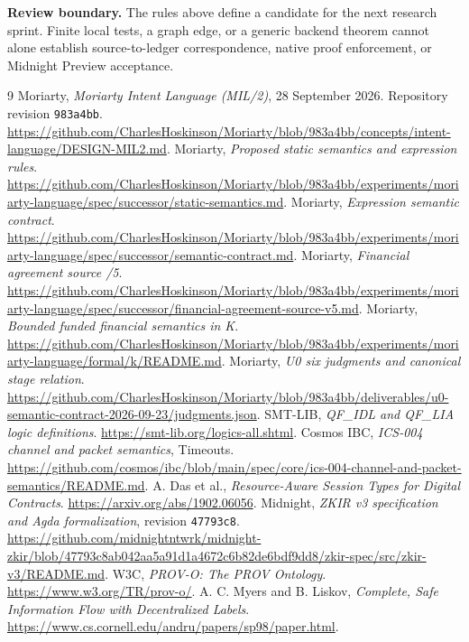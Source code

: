 \documentclass[11pt,a4paper]{article}
\theoremstyle{definition}
\begin{document}
\noindent\textbf{Review boundary.} The rules above define a candidate for the next research sprint. Finite local tests, a graph edge, or a generic backend theorem cannot alone establish source-to-ledger correspondence, native proof enforcement, or Midnight Preview acceptance.

\begingroup\RaggedRight
\begin{thebibliography}{9}
 Moriarty, \emph{Moriarty Intent Language (MIL/2)}, 28 September 2026. Repository revision \texttt{983a4bb}. \url{https://github.com/CharlesHoskinson/Moriarty/blob/983a4bb/concepts/intent-language/DESIGN-MIL2.md}.
 Moriarty, \emph{Proposed static semantics and expression rules}. \url{https://github.com/CharlesHoskinson/Moriarty/blob/983a4bb/experiments/moriarty-language/spec/successor/static-semantics.md}.
 Moriarty, \emph{Expression semantic contract}. \url{https://github.com/CharlesHoskinson/Moriarty/blob/983a4bb/experiments/moriarty-language/spec/successor/semantic-contract.md}.
 Moriarty, \emph{Financial agreement source /5}. \url{https://github.com/CharlesHoskinson/Moriarty/blob/983a4bb/experiments/moriarty-language/spec/successor/financial-agreement-source-v5.md}.
 Moriarty, \emph{Bounded funded financial semantics in K}. \url{https://github.com/CharlesHoskinson/Moriarty/blob/983a4bb/experiments/moriarty-language/formal/k/README.md}.
 Moriarty, \emph{U0 six judgments and canonical stage relation}. \url{https://github.com/CharlesHoskinson/Moriarty/blob/983a4bb/deliverables/u0-semantic-contract-2026-09-23/judgments.json}.
 SMT-LIB, \emph{QF\_IDL and QF\_LIA logic definitions}. \url{https://smt-lib.org/logics-all.shtml}.
 Cosmos IBC, \emph{ICS-004 channel and packet semantics}, Timeouts. \url{https://github.com/cosmos/ibc/blob/main/spec/core/ics-004-channel-and-packet-semantics/README.md}.
 A. Das et al., \emph{Resource-Aware Session Types for Digital Contracts}. \url{https://arxiv.org/abs/1902.06056}.
 Midnight, \emph{ZKIR v3 specification and Agda formalization}, revision \texttt{47793c8}. \url{https://github.com/midnightntwrk/midnight-zkir/blob/47793c8ab042aa5a91d1a4672c6b82de6bdf9dd8/zkir-spec/src/zkir-v3/README.md}.
 W3C, \emph{PROV-O: The PROV Ontology}. \url{https://www.w3.org/TR/prov-o/}.
 A. C. Myers and B. Liskov, \emph{Complete, Safe Information Flow with Decentralized Labels}. \url{https://www.cs.cornell.edu/andru/papers/sp98/paper.html}.
\end{thebibliography}
\endgroup
\end{document}
